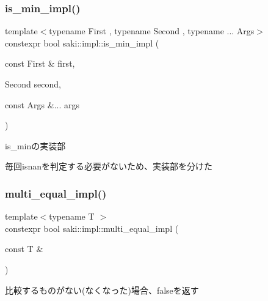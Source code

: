 \subsubsection{\texorpdfstring{is\+\_\+min\+\_\+impl()}{is\_min\_impl()}\hspace{0.1cm}{\footnotesize\ttfamily [2/2]}}
{\footnotesize\ttfamily template$<$typename First , typename Second , typename ... Args$>$ \\
constexpr bool saki\+::impl\+::is\+\_\+min\+\_\+impl (\begin{DoxyParamCaption}\item[{const First \&}]{first,  }\item[{Second}]{second,  }\item[{const Args \&...}]{args }\end{DoxyParamCaption})}



is\+\_\+minの実装部 

毎回isnanを判定する必要がないため、実装部を分けた \mbox{\label{namespacesaki_1_1impl_ac271639854025a923addee4879780f96}} 
\subsubsection{\texorpdfstring{multi\+\_\+equal\+\_\+impl()}{multi\_equal\_impl()}\hspace{0.1cm}{\footnotesize\ttfamily [1/2]}}
{\footnotesize\ttfamily template$<$typename T $>$ \\
constexpr bool saki\+::impl\+::multi\+\_\+equal\+\_\+impl (\begin{DoxyParamCaption}\item[{const T \&}]{ }\end{DoxyParamCaption})}



比較するものがない(なくなった)場合、falseを返す 

\mbox{\label{namespacesaki_1_1impl_afd0543c20cbd7373bceba87c2af5b3de}} 
